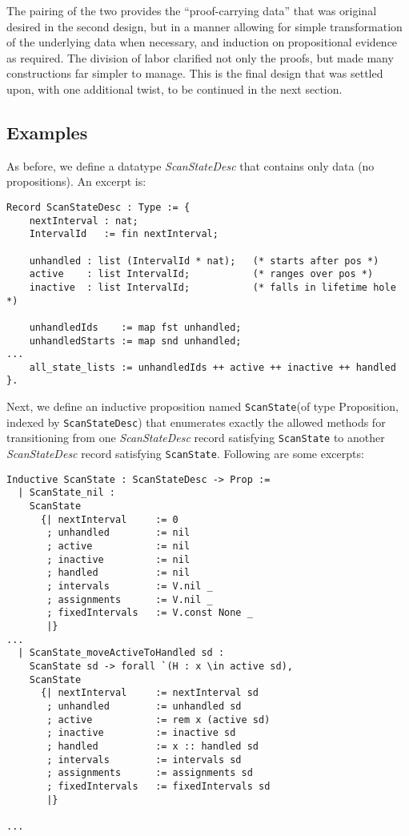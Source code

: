 \documentclass{llncs}
\begin{document}
The pairing of the two provides the ``proof-carrying data'' that
was original desired in the second design, but in a manner allowing for simple
transformation of the underlying data when necessary, and induction on
propositional evidence as required.  The division of labor clarified not only
the proofs, but made many constructions far simpler to manage.  This is the
final design that was settled upon, with one additional twist, to be continued
in the next section.

\subsection{Examples}
\label{sec:examplesv3}

As before, we define a datatype \emph{ScanStateDesc} that contains
only data (no propositions). An excerpt is:
\begin{verbatim}
Record ScanStateDesc : Type := {
    nextInterval : nat;
    IntervalId   := fin nextInterval;

    unhandled : list (IntervalId * nat);   (* starts after pos *)
    active    : list IntervalId;           (* ranges over pos *)
    inactive  : list IntervalId;           (* falls in lifetime hole *)

    unhandledIds    := map fst unhandled;
    unhandledStarts := map snd unhandled;
...
    all_state_lists := unhandledIds ++ active ++ inactive ++ handled
}.
\end{verbatim}

Next, we define an inductive proposition named \texttt{ScanState}(of
type Proposition, indexed by \texttt{ScanStateDesc}) that enumerates
exactly the allowed methods for transitioning from one
\emph{ScanStateDesc} record satisfying \texttt{ScanState} to another
\emph{ScanStateDesc} record satisfying \texttt{ScanState}. Following
are some excerpts:

\begin{verbatim}
Inductive ScanState : ScanStateDesc -> Prop :=
  | ScanState_nil :
    ScanState
      {| nextInterval     := 0
       ; unhandled        := nil
       ; active           := nil
       ; inactive         := nil
       ; handled          := nil
       ; intervals        := V.nil _
       ; assignments      := V.nil _
       ; fixedIntervals   := V.const None _
       |}
...
  | ScanState_moveActiveToHandled sd :
    ScanState sd -> forall `(H : x \in active sd),
    ScanState
      {| nextInterval     := nextInterval sd
       ; unhandled        := unhandled sd
       ; active           := rem x (active sd)
       ; inactive         := inactive sd
       ; handled          := x :: handled sd
       ; intervals        := intervals sd
       ; assignments      := assignments sd
       ; fixedIntervals   := fixedIntervals sd
       |}

...
\end{verbatim}
\end{document}
